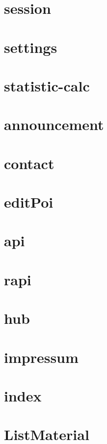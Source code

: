 \section{session}

\newpage
\section{settings}

\newpage
\section{statistic-calc}

\newpage
\section{announcement}

\newpage
\section{contact}

\newpage
\section{editPoi}

\newpage
\section{api}

\newpage
\section{rapi}

\newpage
\section{hub}

\newpage
\section{impressum}

\newpage
\section{index}

\newpage
\section{ListMaterial}

\newpage
